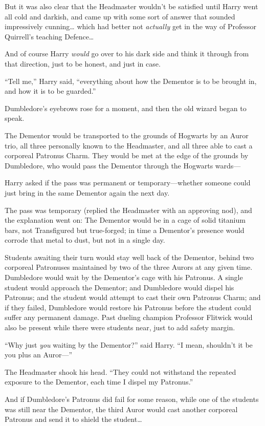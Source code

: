 But it was also clear that the Headmaster wouldn't be satisfied until
Harry went all cold and darkish, and came up with some sort of answer
that sounded impressively cunning\ldots{} which had better not
\emph{actually} get in the way of Professor Quirrell's teaching
Defence\ldots{}

And of course Harry \emph{would} go over to his dark side and think it
through from that direction, just to be honest, and just in case.

``Tell me,'' Harry said, ``everything about how the Dementor is to be
brought in, and how it is to be guarded.''

Dumbledore's eyebrows rose for a moment, and then the old wizard began
to speak.

The Dementor would be transported to the grounds of Hogwarts by an Auror
trio, all three personally known to the Headmaster, and all three able
to cast a corporeal Patronus Charm. They would be met at the edge of the
grounds by Dumbledore, who would pass the Dementor through the Hogwarts
wards---

Harry asked if the pass was permanent or temporary---whether someone
could just bring in the same Dementor again the next day.

The pass was temporary (replied the Headmaster with an approving nod),
and the explanation went on: The Dementor would be in a cage of solid
titanium bars, not Transfigured but true-forged; in time a Dementor's
presence would corrode that metal to dust, but not in a single day.

Students awaiting their turn would stay well back of the Dementor,
behind two corporeal Patronuses maintained by two of the three Aurors at
any given time. Dumbledore would wait by the Dementor's cage with his
Patronus. A single student would approach the Dementor; and Dumbledore
would dispel his Patronus; and the student would attempt to cast their
own Patronus Charm; and if they failed, Dumbledore would restore his
Patronus before the student could suffer any permanent damage. Past
dueling champion Professor Flitwick would also be present while there
were students near, just to add safety margin.

``Why just \emph{you} waiting by the Dementor?'' said Harry. ``I mean,
shouldn't it be you plus an Auror---''

The Headmaster shook his head. ``They could not withstand the repeated
exposure to the Dementor, each time I dispel my Patronus.''

And if Dumbledore's Patronus did fail for some reason, while one of the
students was still near the Dementor, the third Auror would cast another
corporeal Patronus and send it to shield the student\ldots{}

